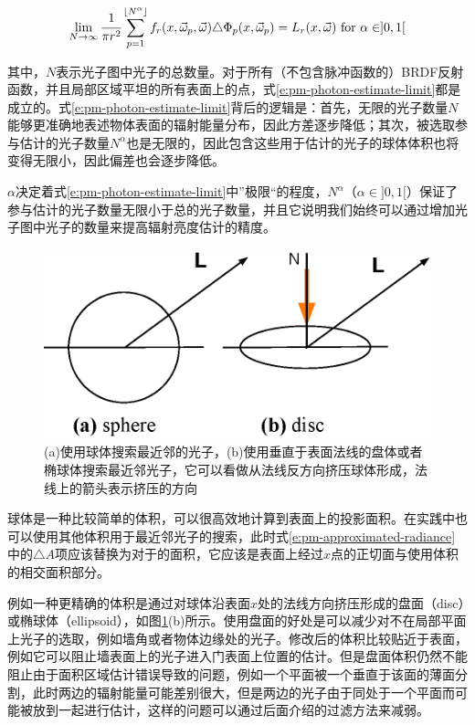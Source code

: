 \begin{equation}\label{e:pm-photon-estimate-limit}
	\lim_{N\to\infty} \cfrac{1}{\pi r^{2}}\sum^{\lfloor N^{\alpha}\rfloor}_{p=1}f_r(x,\vec{\omega}_p,\vec{\omega})\triangle\Phi_p(x,\vec{\omega}_p)=L_r(x,\vec{\omega})\text{ for }\alpha\in ]0,1[
\end{equation}

\noindent 其中，$N$表示光子图中光子的总数量。对于所有（不包含脉冲函数的）BRDF反射函数，并且局部区域平坦的所有表面上的点，式\ref{e:pm-photon-estimate-limit}都是成立的。式\ref{e:pm-photon-estimate-limit}背后的逻辑是：首先，无限的光子数量$N$能够更准确地表述物体表面的辐射能量分布，因此方差逐步降低；其次，被选取参与估计的光子数量$N^{\alpha}$也是无限的，因此包含这些用于估计的光子的球体体积也将变得无限小，因此偏差也会逐步降低。

$\alpha$决定着式\ref{e:pm-photon-estimate-limit}中”极限“的程度，$N^{\alpha}$（$\alpha\in]0,1[$）保证了参与估计的光子数量无限小于总的光子数量，并且它说明我们始终可以通过增加光子图中光子的数量来提高辐射亮度估计的精度。

\begin{figure}
\sidecaption
	\includegraphics[width=.55\textwidth]{figures/pm/disc}
\caption{(a)使用球体搜索最近邻的光子，(b)使用垂直于表面法线的盘体或者椭球体搜索最近邻光子，它可以看做从法线反方向挤压球体形成，法线上的箭头表示挤压的方向}
\label{f:pm-sphere-and-disc}
\end{figure}

球体是一种比较简单的体积，可以很高效地计算到表面上的投影面积。在实践中也可以使用其他体积用于最近邻光子的搜索，此时式\ref{e:pm-approximated-radiance}中的$\triangle A$项应该替换为对于的面积，它应该是表面上经过$x$点的正切面与使用体积的相交面积部分。

例如一种更精确的体积是通过对球体沿表面$x$处的法线方向挤压形成的盘面（disc）或椭球体（ellipsoid），如图\ref{f:pm-sphere-and-disc}(b)所示。使用盘面的好处是可以减少对不在局部平面上光子的选取，例如墙角或者物体边缘处的光子。修改后的体积比较贴近于表面，例如它可以阻止墙表面上的光子进入门表面上位置的估计。但是盘面体积仍然不能阻止由于面积区域估计错误导致的问题，例如一个平面被一个垂直于该面的薄面分割，此时两边的辐射能量可能差别很大，但是两边的光子由于同处于一个平面而可能被放到一起进行估计，这样的问题可以通过后面介绍的过滤方法来减弱。





